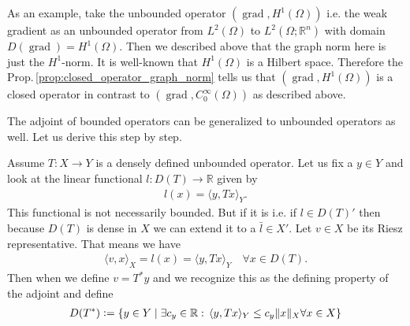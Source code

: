 \documentclass[12pt,a4paper]{article}
\numberwithin{equation}{subsection}
\numberwithin{lemma}{subsection}
\theoremstyle{definition}
\DeclareMathOperator{\grad}{grad}
\newcommand{\real}{\mathbb{R}}
\begin{document}
As an example, take the unbounded operator $(\grad, H^1(\Omega))$
i.e. the weak gradient as an unbounded operator 
from $L^2(\Omega)$ to $L^2(\Omega;\real^n)$ with 
domain $D(\grad) = H^1(\Omega)$. Then we described above that the 
graph norm here is just the $H^1$-norm. It is well-known that 
$H^1(\Omega)$ is a Hilbert space. Therefore the 
Prop.\,\ref{prop:closed_operator_graph_norm} tells us that 
$(\grad, H^1(\Omega))$ is a closed operator in contrast to 
$(\grad, C_0^\infty(\Omega))$ as described above.

The adjoint of bounded operators can be generalized to unbounded operators 
as well. Let us derive this step by step. 

Assume $T: X \rightarrow Y$ is a densely defined unbounded operator. 
Let us fix a $y \in Y$ and 
look at the linear functional $l:D(T) \rightarrow \real$ given by
\begin{align*}
    l(x) = \langle y, Tx \rangle_Y.
\end{align*}
This functional is not necessarily bounded. But if it is i.e. if $l \in D(T)'$ 
then because $D(T)$ is dense in $X$ we can extend it to a
$\bar{l} \in X'$. Let $v \in X$ be its Riesz representative. That means we have
\begin{align*}
    \langle v, x \rangle_X = l(x) = \langle y, Tx \rangle_Y 
        \quad \forall x \in D(T).
\end{align*}
Then when we define $v = T^* y$ and we 
recognize this as the defining property of the adjoint and define 
\begin{align*}
    D(T^*) \vcentcolon= \{ y \in Y \mid \exists c_y \in \real:
        \,\langle y, Tx \rangle_Y \leq c_y \lVert x \rVert _X \forall x \in X\}
\end{align*}
\end{document}
